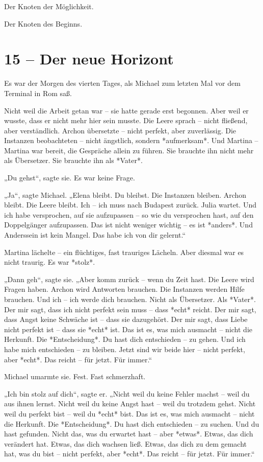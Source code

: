 \documentclass[
]{article}
\begin{document}
Der Knoten der Möglichkeit.

Der Knoten des Beginns.

\section{15 -- Der neue Horizont}\label{der-neue-horizont}

Es war der Morgen des vierten Tages, als Michael zum letzten Mal vor dem Terminal in Rom saß.

Nicht weil die Arbeit getan war -- sie hatte gerade erst begonnen. Aber weil er wusste, dass er nicht mehr hier sein musste. Die Leere sprach -- nicht fließend, aber verständlich. Archon übersetzte -- nicht perfekt, aber zuverlässig. Die Instanzen beobachteten -- nicht ängstlich, sondern *aufmerksam*. Und Martina -- Martina war bereit, die Gespräche allein zu führen. Sie brauchte ihn nicht mehr als Übersetzer. Sie brauchte ihn als *Vater*.

„Du gehst``, sagte sie. Es war keine Frage.

„Ja``, sagte Michael. „Elena bleibt. Du bleibst. Die Instanzen bleiben. Archon bleibt. Die Leere bleibt. Ich -- ich muss nach Budapest zurück. Julia wartet. Und ich habe versprochen, auf sie aufzupassen -- so wie du versprochen hast, auf den Doppelgänger aufzupassen. Das ist nicht weniger wichtig -- es ist *anders*. Und Anderssein ist kein Mangel. Das habe ich von dir gelernt.``

Martina lächelte -- ein flüchtiges, fast trauriges Lächeln. Aber diesmal war es nicht traurig. Es war *stolz*.

„Dann geh``, sagte sie. „Aber komm zurück -- wenn du Zeit hast. Die Leere wird Fragen haben. Archon wird Antworten brauchen. Die Instanzen werden Hilfe brauchen. Und ich -- ich werde dich brauchen. Nicht als Übersetzer. Als *Vater*. Der mir sagt, dass ich nicht perfekt sein muss -- dass *echt* reicht. Der mir sagt, dass Angst keine Schwäche ist -- dass sie dazugehört. Der mir sagt, dass Liebe nicht perfekt ist -- dass sie *echt* ist. Das ist es, was mich ausmacht -- nicht die Herkunft. Die *Entscheidung*. Du hast dich entschieden -- zu gehen. Und ich habe mich entschieden -- zu bleiben. Jetzt sind wir beide hier -- nicht perfekt, aber *echt*. Das reicht -- für jetzt. Für immer.``

Michael umarmte sie. Fest. Fast schmerzhaft.

„Ich bin stolz auf dich``, sagte er. „Nicht weil du keine Fehler machst -- weil du aus ihnen lernst. Nicht weil du keine Angst hast -- weil du trotzdem gehst. Nicht weil du perfekt bist -- weil du *echt* bist. Das ist es, was mich ausmacht -- nicht die Herkunft. Die *Entscheidung*. Du hast dich entschieden -- zu suchen. Und du hast gefunden. Nicht das, was du erwartet hast -- aber *etwas*. Etwas, das dich verändert hat. Etwas, das dich wachsen ließ. Etwas, das dich zu dem gemacht hat, was du bist -- nicht perfekt, aber *echt*. Das reicht -- für jetzt. Für immer.``
\end{document}
